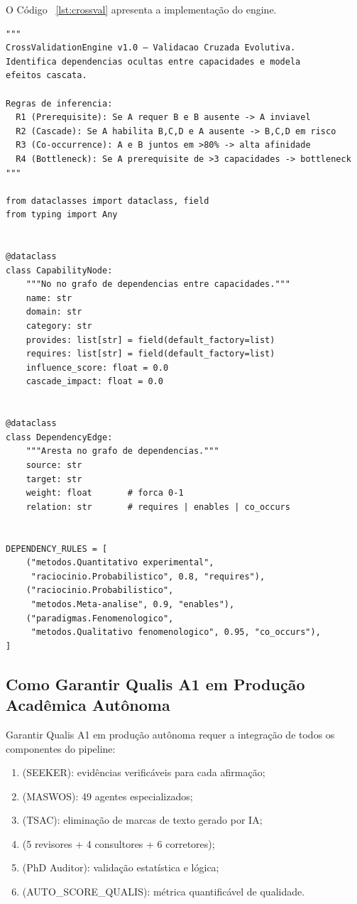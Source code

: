 O Código~ \ref{lst:crossval} apresenta a implementação do engine.

\begin{lstlisting}[caption={cross\_validation\_engine.py (abreviado)},
label={lst:crossval}, style=pythonstyle]
"""
CrossValidationEngine v1.0 — Validacao Cruzada Evolutiva.
Identifica dependencias ocultas entre capacidades e modela
efeitos cascata.

Regras de inferencia:
  R1 (Prerequisite): Se A requer B e B ausente -> A inviavel
  R2 (Cascade): Se A habilita B,C,D e A ausente -> B,C,D em risco
  R3 (Co-occurrence): A e B juntos em >80% -> alta afinidade
  R4 (Bottleneck): Se A prerequisite de >3 capacidades -> bottleneck
"""

from dataclasses import dataclass, field
from typing import Any


@dataclass
class CapabilityNode:
    """No no grafo de dependencias entre capacidades."""
    name: str
    domain: str
    category: str
    provides: list[str] = field(default_factory=list)
    requires: list[str] = field(default_factory=list)
    influence_score: float = 0.0
    cascade_impact: float = 0.0


@dataclass
class DependencyEdge:
    """Aresta no grafo de dependencias."""
    source: str
    target: str
    weight: float       # forca 0-1
    relation: str       # requires | enables | co_occurs


DEPENDENCY_RULES = [
    ("metodos.Quantitativo experimental",
     "raciocinio.Probabilistico", 0.8, "requires"),
    ("raciocinio.Probabilistico",
     "metodos.Meta-analise", 0.9, "enables"),
    ("paradigmas.Fenomenologico",
     "metodos.Qualitativo fenomenologico", 0.95, "co_occurs"),
]
\end{lstlisting}

\subsection{Como Garantir Qualis A1 em Produção Acadêmica Autônoma}

Garantir Qualis A1 em produção autônoma requer a integração de
todos os componentes do pipeline:

\begin{enumerate}
\item {} (SEEKER): evidências verificáveis
para cada afirmação;
\item {} (MASWOS): 49 agentes
especializados;
\item {} (TSAC): eliminação de marcas de
texto gerado por IA;
\item {} (5 revisores + 4 consultores +
6 corretores);
\item {} (PhD Auditor): validação estatística
e lógica;
\item {} (AUTO\_SCORE\_QUALIS): métrica
quantificável de qualidade.
\end{enumerate}

